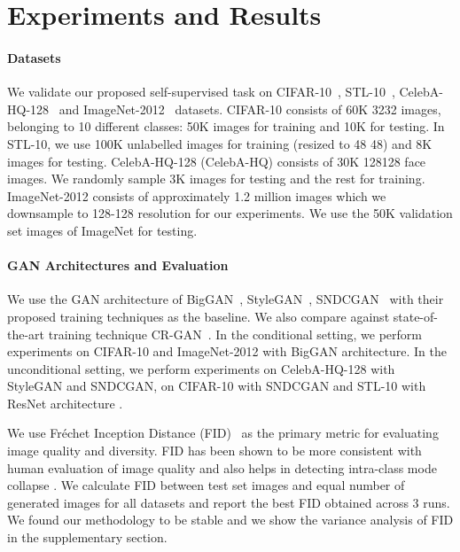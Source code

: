 \documentclass[10pt,twocolumn,letterpaper]{article}
\begin{document}
\section{Experiments and Results}
\vspace{-5pt}
\paragraph{Datasets} 
We validate our proposed self-supervised task on CIFAR-10~\cite{krizhevsky2010cifar}, STL-10~\cite{stl10}, CelebA-HQ-128~\cite{pggan2018celeba} and ImageNet-2012~\cite{krizhevsky2012imagenet} datasets. CIFAR-10 consists of 60K 3232 images, belonging to 10 different classes: 50K images for training and 10K for testing. In STL-10, we use 100K unlabelled images for training (resized to 48  48) and 8K images for testing. CelebA-HQ-128 (CelebA-HQ) consists of 30K 128128 face images. We randomly sample 3K images for testing and the rest for training. ImageNet-2012 consists of approximately 1.2 million images which we downsample to 128-128 resolution for our experiments. We use the 50K validation set images of ImageNet for testing. 

\paragraph{GAN Architectures and Evaluation}
We use the GAN architecture of BigGAN~\cite{biggan2018brock}, StyleGAN~\cite{stylegan2019karras}, SNDCGAN~\cite{sngan_proj} with their proposed training techniques as the baseline. We also compare against state-of-the-art training technique CR-GAN~\cite{crgan2019chen}. In the conditional setting, we perform experiments on CIFAR-10 and ImageNet-2012 with BigGAN architecture. In the unconditional setting, we perform experiments on CelebA-HQ-128 with StyleGAN and SNDCGAN, on CIFAR-10 with SNDCGAN and STL-10 with ResNet architecture \cite{sngan_proj}. 
\par
We use Fr\'echet Inception Distance (FID)~\cite{fid2017martin} as the primary metric for evaluating image quality and diversity. FID has been shown to be more consistent with human evaluation of image quality and also helps in detecting intra-class mode collapse \cite{fid2017martin}. We calculate FID between test set images and equal number of generated images for all datasets and report the best FID obtained across 3 runs. We found our methodology to be stable and we show the variance analysis of FID in the supplementary section. 
\end{document}
